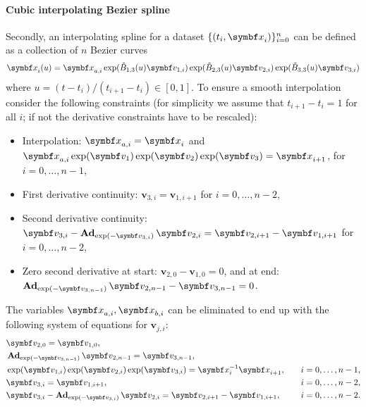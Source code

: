 \paragraph{Cubic interpolating Bezier spline} Secondly, an interpolating spline for a dataset $\{ ( t_{i}, \x_{i} ) \}_{i=0}^{n}$ can be defined as a collection of $n$ Bezier curves $$\x_{i}(u) = \x_{a, i} \exp (\tilde B_{1, 3}(u) \symbf v_{1, i})\exp (\tilde B_{2, 3}(u) \symbf v_{2, i})\exp (\tilde B_{3, 3}(u) \symbf v_{3, i})$$ where $u = (t - t_{i}) / (t_{i+1} - t_{i}) \in [0, 1]$. To ensure a smooth interpolation consider the following constraints (for simplicity we assume that $t_{i+1} - t_{i} = 1$ for all $i$; if not the derivative constraints have to be rescaled):
\begin{itemize}
  \item Interpolation: $\x_{a, i} = \x_{i}$ and $\x_{a, i} \exp(\symbf v_{1}) \exp(\symbf v_{2})\exp(\symbf v_{3})= \x_{i+1}$, for $i = 0, \ldots, n-1$,
  \item First derivative continuity: $\symbf v_{3, i} = \symbf v_{1, i+1}$ for $i = 0, \ldots, n-2$,
  \item Second derivative continuity: $\symbf v_{3, i} - \bAd_{\exp(-\symbf v_{3, i})} \symbf v_{2, i} = \symbf v_{2, i+1} - \symbf v_{1, i+1}$ for $i = 0, \ldots, n-2$,
  \item Zero second derivative at start: $\symbf v_{2, 0} - \symbf v_{1, 0} = 0$, and at end: $\bAd_{\exp(-\symbf v_{3, n-1})} \symbf v_{2, n-1} - \symbf v_{3, n-1} = 0$.
\end{itemize}
The variables $\x_{a, i}, \x_{b, i}$ can be eliminated to end up with the following system of equations for $\symbf v_{j, i}$:
\begin{equation}
  \label{eq:cubic_spline_equations}
  \begin{aligned}
     & \symbf v_{2, 0} = \symbf v_{1, 0},                                                                                                   \\
     & \bAd_{\exp(-\symbf v_{3, n-1})}\symbf v_{2, n-1} = \symbf v_{3, n-1},                                                                \\
     & \exp (\symbf v_{1, i}) \exp (\symbf v_{2, i}) \exp (\symbf v_{3, i}) = \x_{i}^{-1} \x_{i+1},                      & \quad i = 0, \ldots, n-1, \\
     & \symbf v_{3, i} = \symbf v_{1, i+1},                                                                     & \quad i = 0, \ldots, n-2, \\
     & \symbf v_{3, i} - \bAd_{\exp(-\symbf v_{3, i})} \symbf v_{2, i} = \symbf v_{2, i+1} - \symbf v_{1, i+1}, & \quad i = 0, \ldots, n-2. \\
  \end{aligned}
\end{equation}
